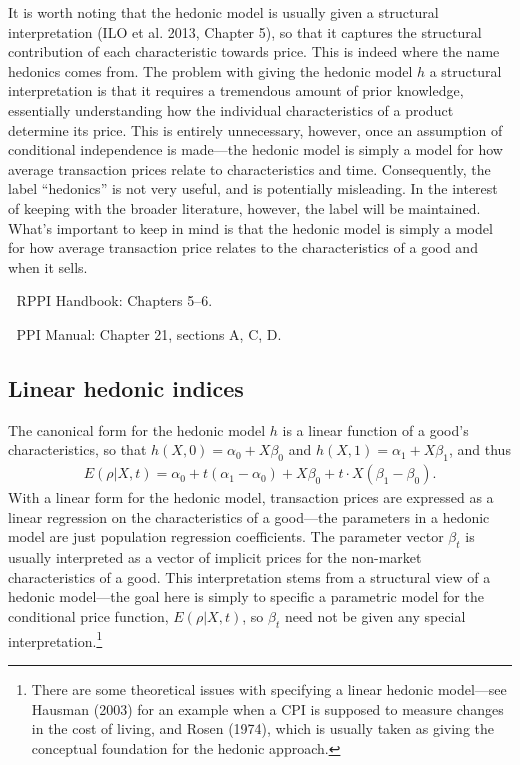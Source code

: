 \documentclass[
]{article}
\begin{document}
It is worth noting that the hedonic model is usually given a structural interpretation (ILO et al. 2013, Chapter 5), so that it captures the structural contribution of each characteristic towards price. This is indeed where the name hedonics comes from. The problem with giving the hedonic model \(h\) a structural interpretation is that it requires a tremendous amount of prior knowledge, essentially understanding how the individual characteristics of a product determine its price. This is entirely unnecessary, however, once an assumption of conditional independence is made---the hedonic model is simply a model for how average transaction prices relate to characteristics and time. Consequently, the label ``hedonics'' is not very useful, and is potentially misleading. In the interest of keeping with the broader literature, however, the label will be maintained. What's important to keep in mind is that the hedonic model is simply a model for how average transaction price relates to the characteristics of a good and when it sells.

📖 RPPI Handbook: Chapters 5--6.

📖 PPI Manual: Chapter 21, sections A, C, D.

\hypertarget{linear-hedonic-indices}{%
\subsection{Linear hedonic indices}\label{linear-hedonic-indices}}

The canonical form for the hedonic model \(h\) is a linear function of a good's characteristics, so that \(h(X, 0) = \alpha_{0} + X\beta_{0}\) and \(h(X, 1) = \alpha_{1} + X\beta_{1}\), and thus
\begin{align*}
E(\rho | X, t) = \alpha_{0} + t(\alpha_{1} - \alpha_{0}) + X\beta_{0} + t \cdot X (\beta_{1} - \beta_{0}).
\end{align*}
With a linear form for the hedonic model, transaction prices are expressed as a linear regression on the characteristics of a good---the parameters in a hedonic model are just population regression coefficients. The parameter vector \(\beta_{t}\) is usually interpreted as a vector of implicit prices for the non-market characteristics of a good. This interpretation stems from a structural view of a hedonic model---the goal here is simply to specific a parametric model for the conditional price function, \(E(\rho | X, t)\), so \(\beta_{t}\) need not be given any special interpretation.\footnote{There are some theoretical issues with specifying a linear hedonic model---see Hausman (2003) for an example when a CPI is supposed to measure changes in the cost of living, and Rosen (1974), which is usually taken as giving the conceptual foundation for the hedonic approach.}
\end{document}
